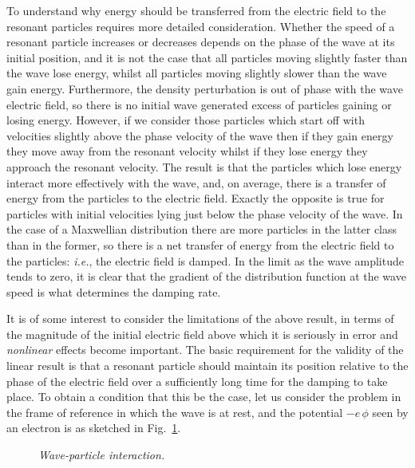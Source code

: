 To understand why energy should be transferred from the electric
field to the resonant particles requires more detailed consideration. 
Whether the speed of a resonant particle increases or decreases depends on the
phase of the wave at its initial position, and it is not the case that
all particles moving slightly faster than the wave lose energy, whilst all
particles moving slightly slower than the wave gain energy. Furthermore, the
density perturbation is out of phase with the wave electric field, so there
is no initial wave generated excess of particles gaining or losing
energy. However, if we consider those particles which start off with velocities
slightly above the phase velocity of the wave then if they gain energy they
move away from the resonant velocity whilst if they lose energy they approach
the resonant velocity. The result is that the particles which lose energy interact more effectively with the wave, and, on average, there is a transfer of
energy from the particles to the electric field. Exactly the opposite
is true for particles with initial velocities lying just below the
phase velocity of the wave. In the case of a Maxwellian distribution
there are more particles in the latter class than in the former, so there is a net transfer
of energy from the electric field to the particles: {\em i.e.}, the 
electric field is damped. In the limit as the wave amplitude
tends to zero, it is clear that the gradient of the distribution function
at the wave speed is what determines the damping rate.

It is of some interest to consider the limitations of the above result, in terms
of the magnitude of the initial electric field above which it is seriously
in error and {\em nonlinear}\/ effects become important. The basic
requirement for the validity of the linear result is that a resonant
particle should maintain its position relative to the phase of the
electric field over a sufficiently long time for the damping to
take place. To obtain a condition that this be the case, let us consider the
problem in the frame of reference in which the wave is at rest, and the
potential $-e\,\phi$ seen by an electron is as sketched in Fig.~\ref{f34}.

\begin{figure}
\epsfysize=2.5in
\centerline{}
\caption{\em Wave-particle interaction.}\label{f34}
\end{figure}

